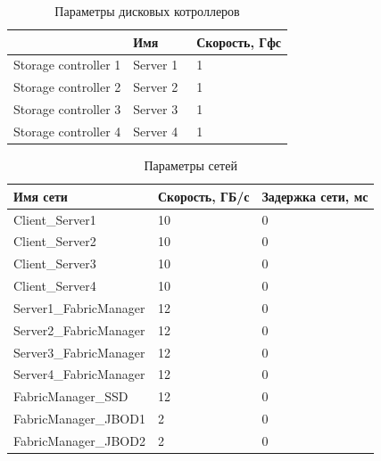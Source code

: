 \begin{table}[]
\centering
\caption{Параметры дисковых котроллеров}
\label{tab:storage-contollers}
\begin{tabularx}{\textwidth}{|l|l|l|} 
\hline
                     & Имя       & Скорость, Гфс  \\ 
\hline
Storage controller 1 & Server 1~ & 1              \\ 
\hline
Storage controller 2 & Server 2~ & 1              \\ 
\hline
Storage controller 3 & Server 3~ & 1              \\ 
\hline
Storage controller 4 & Server 4~ & 1              \\
\hline
\end{tabularx}
\end{table}


\begin{table}
\centering
\caption{Параметры сетей}
\label{tab:links}
\begin{tabularx}{\textwidth}{|l|l|l|} 
\hline
Имя сети               & Скорость, ГБ/с & Задержка сети, мс  \\ 
\hline
Client\_Server1        & 10             & 0                  \\ 
\hline
Client\_Server2        & 10             & 0                  \\ 
\hline
Client\_Server3        & 10             & 0                  \\ 
\hline
Client\_Server4        & 10             & 0                  \\ 
\hline
Server1\_FabricManager & 12             & 0                  \\ 
\hline
Server2\_FabricManager & 12             & 0                  \\ 
\hline
Server3\_FabricManager & 12             & 0                  \\ 
\hline
Server4\_FabricManager & 12             & 0                  \\ 
\hline
FabricManager\_SSD     & 12             & 0                  \\ 
\hline
FabricManager\_JBOD1   & 2              & 0                  \\ 
\hline
FabricManager\_JBOD2   & 2              & 0                  \\
\hline
\end{tabularx}
\end{table}
